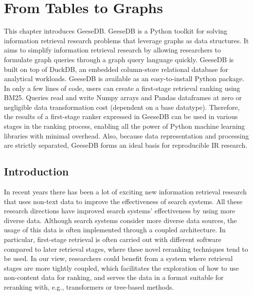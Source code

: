 \chapter{From Tables to Graphs}
\label{from-tables-to-graphs}

\begin{Abstract}
	\begin{changemargin}{1cm}{1cm}
		This chapter introduces GeeseDB. GeeseDB is a Python toolkit for solving information retrieval research problems that leverage graphs as data structures. It aims to simplify information retrieval research by allowing researchers to formulate graph queries through a graph query language quickly. GeeseDB is built on top of DuckDB, an embedded column-store relational database for analytical workloads. GeeseDB is available as an easy-to-install Python package. In only a few lines of code, users can create a first-stage retrieval ranking using BM25. Queries read and write Numpy arrays and Pandas dataframes at zero or negligible data transformation cost (dependent on a base datatype). Therefore, the results of a first-stage ranker expressed in GeeseDB can be used	in various stages in the ranking process, enabling all the power of Python machine learning libraries with minimal overhead. Also, because data representation and processing are strictly separated, GeeseDB forms an ideal basis for reproducible IR research.
	\end{changemargin}
\end{Abstract}

\section{Introduction}
In recent years there has been a lot of exciting new information retrieval research that uses non-text data to improve the effectiveness of search systems. All these research directions have improved search systems' effectiveness by using more diverse data. Although search systems consider more diverse data sources, the usage of this data is often implemented through a coupled architecture. In particular, first-stage retrieval is often carried out with different software compared to later retrieval stages, where these novel reranking techniques tend to be used. In our view, researchers could benefit from a system where retrieval stages are more tightly coupled, which facilitates the exploration of how to use non-content data for ranking, and serves the data in a format suitable for reranking with, e.g., transformers or tree-based methods.

